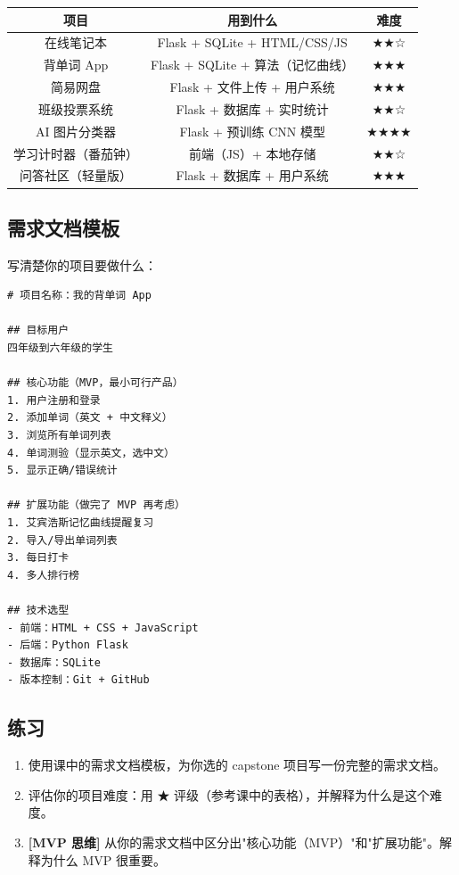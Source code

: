 \documentclass[a4paper,12pt]{ctexart}
\begin{document}
\begin{center}
\begin{tabular}{|c|c|c|}
\hline
\textbf{项目} & \textbf{用到什么} & \textbf{难度} \\ \hline
在线笔记本 & Flask + SQLite + HTML/CSS/JS & ★★☆ \\ \hline
背单词 App & Flask + SQLite + 算法（记忆曲线） & ★★★ \\ \hline
简易网盘 & Flask + 文件上传 + 用户系统 & ★★★ \\ \hline
班级投票系统 & Flask + 数据库 + 实时统计 & ★★☆ \\ \hline
AI 图片分类器 & Flask + 预训练 CNN 模型 & ★★★★ \\ \hline
学习计时器（番茄钟） & 前端（JS）+ 本地存储 & ★★☆ \\ \hline
问答社区（轻量版） & Flask + 数据库 + 用户系统 & ★★★ \\ \hline
\end{tabular}
\end{center}

\subsection*{需求文档模板}

写清楚你的项目要做什么：

\begin{lstlisting}
# 项目名称：我的背单词 App

## 目标用户
四年级到六年级的学生

## 核心功能（MVP，最小可行产品）
1. 用户注册和登录
2. 添加单词（英文 + 中文释义）
3. 浏览所有单词列表
4. 单词测验（显示英文，选中文）
5. 显示正确/错误统计

## 扩展功能（做完了 MVP 再考虑）
1. 艾宾浩斯记忆曲线提醒复习
2. 导入/导出单词列表
3. 每日打卡
4. 多人排行榜

## 技术选型
- 前端：HTML + CSS + JavaScript
- 后端：Python Flask
- 数据库：SQLite
- 版本控制：Git + GitHub
\end{lstlisting}

\subsection*{练习}

\begin{enumerate}
  \item 使用课中的需求文档模板，为你选的 capstone 项目写一份完整的需求文档。
  \item 评估你的项目难度：用 ★ 评级（参考课中的表格），并解释为什么是这个难度。
  \item \textbf{[MVP 思维]} 从你的需求文档中区分出"核心功能（MVP）"和"扩展功能"。解释为什么 MVP 很重要。
\end{enumerate}
\end{document}
